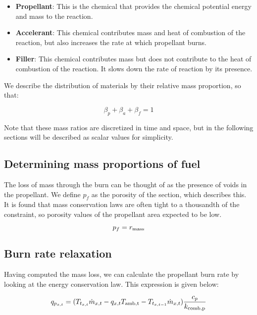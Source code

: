 \begin{itemize}
    \item \textbf{Propellant}: This is the chemical that
    provides the chemical potential energy and mass to the reaction.
    \item \textbf{Accelerant}: This chemical contributes mass and heat of combustion of the reaction,
    but also increases the rate at which  propellant burns.
    \item \textbf{Filler}: This chemical contributes mass but does not contribute
    to the heat of combustion of the reaction. It slows down the rate of reaction by
    its presence.
\end{itemize}

We describe the distribution of materials by their relative mass proportion, so that:

\begin{equation}
    \beta_p + \beta_a + \beta_f = 1
\end{equation}

Note that these mass ratios are discretized in time and space, but in the following
sections will be described as scalar values for simplicity.

\subsection{Determining mass proportions of fuel}

The loss of mass through the burn can be thought of as the presence of voids in the
propellant. We define $p_f$ as the porosity of the section, which describes this.
It is found that mass conservation laws are often tight to a thousandth of the constraint,
so porosity values of the propellant area expected to be low.

\begin{equation}
    p_f = r_{\rm{mass}}
\end{equation}

\subsection{Burn rate relaxation}

Having computed the mass loss, we can calculate the propellant burn rate
by looking at the energy conservation law. This expression is given below:

\begin{equation}
    q_{p_{x,t}} = (T_{t_{x,t}} \dot{m}_{x,t} - q_{x,t} T_{\rm{amb},t}- T_{t_{x,t-1}}\dot{m}_{x,t})\frac{c_p}{k_{\rm{comb,p}}}
\end{equation}

